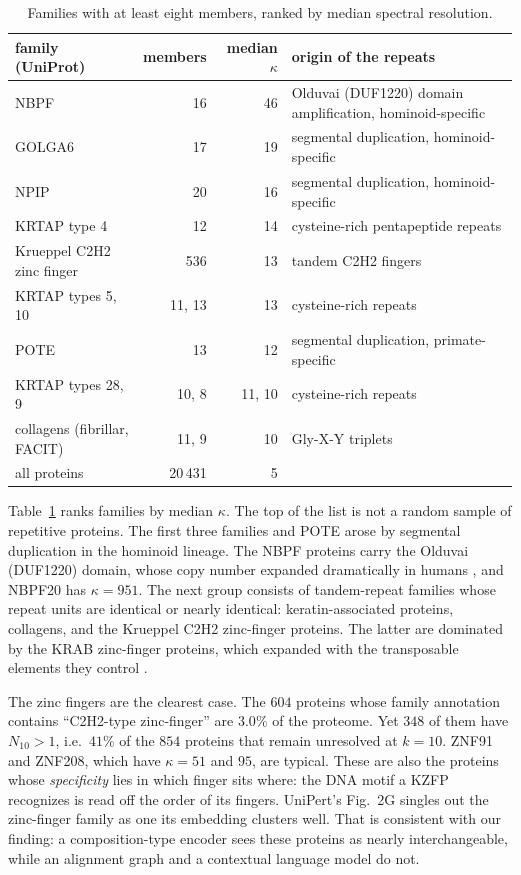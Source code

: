 \begin{table}[t]
\centering\small
\begin{tabular}{>{\raggedright\arraybackslash}p{}rr>{\raggedright\arraybackslash}p{}}
\toprule
family (UniProt) & members & median $\kappa$ & origin of the repeats\\
\midrule
NBPF & 16 & 46 & Olduvai (DUF1220) domain amplification, hominoid-specific\\
GOLGA6 & 17 & 19 & segmental duplication, hominoid-specific\\
NPIP & 20 & 16 & segmental duplication, hominoid-specific\\
KRTAP type 4 & 12 & 14 & cysteine-rich pentapeptide repeats\\
Krueppel C2H2 zinc finger & 536 & 13 & tandem C2H2 fingers\\
KRTAP types 5, 10 & 11, 13 & 13 & cysteine-rich repeats\\
POTE & 13 & 12 & segmental duplication, primate-specific\\
KRTAP types 28, 9 & 10, 8 & 11, 10 & cysteine-rich repeats\\
collagens (fibrillar, FACIT) & 11, 9 & 10 & Gly-X-Y triplets\\
\midrule
all proteins & 20\,431 & 5 & \\
\bottomrule
\end{tabular}
\caption{Families with at least eight members, ranked by median spectral resolution.}\label{ch12:tab:fam}
\end{table}

Table~\ref{ch12:tab:fam} ranks families by median $\kappa$. The top of the list is not a random sample of
repetitive proteins. The first three families and POTE arose by segmental duplication in the hominoid
lineage. The NBPF proteins carry the Olduvai (DUF1220) domain, whose copy number expanded
dramatically in humans \cite{OBl12}, and NBPF20 has $\kappa=951$. The next group consists of tandem-repeat
families whose repeat units are identical or nearly identical: keratin-associated proteins,
collagens, and the Krueppel C2H2 zinc-finger proteins. The latter are dominated by the KRAB
zinc-finger proteins, which expanded with the transposable elements they control \cite{Imb17}.

The zinc fingers are the clearest case. The $604$ proteins whose family annotation contains
``C2H2-type zinc-finger'' are $3.0\%$ of the proteome. Yet $348$ of them have $N_{10}>1$, i.e.\
$41\%$ of the $854$ proteins that remain unresolved at $k=10$. ZNF91 and ZNF208, which have
$\kappa=51$ and $95$, are typical. These are also the proteins whose \emph{specificity} lies in which
finger sits where: the DNA motif a KZFP recognizes is read off the order of its fingers.
UniPert's Fig.~2G singles out the zinc-finger family as one its embedding clusters well. That is
consistent with our finding: a composition-type encoder sees these proteins as nearly
interchangeable, while an alignment graph and a contextual language model do not.

